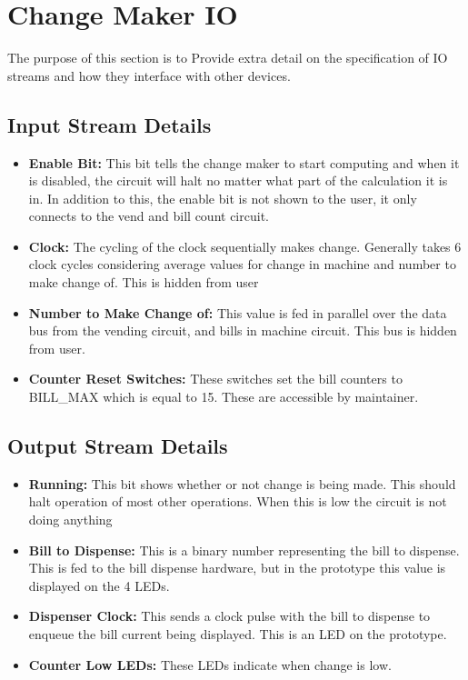 \section{Change Maker IO}
The purpose of this section is to Provide extra detail on
the specification of IO streams and how they interface
with other devices. 

\subsection{Input Stream Details}
\begin{itemize}
\item{\textbf{Enable Bit:} This bit tells the change maker to start computing
and when it is disabled, the circuit will halt no matter what part of
the calculation it is in. In addition to this, the enable bit is not
shown to the user, it only connects to the vend and bill count circuit.}
\item{\textbf{Clock:} The cycling of the clock sequentially makes change. 
Generally takes 6 clock cycles considering average values for change in 
machine and number to make change of. This is hidden from user}
\item{\textbf{Number to Make Change of:} This value is fed in parallel over the
data bus from the vending circuit, and bills in machine circuit. This
bus is hidden from user.}
\item{\textbf{Counter Reset Switches:} These switches set the bill counters to
BILL\_MAX which is equal to 15. These are accessible by maintainer.}
\end{itemize}

\subsection{Output Stream Details}
\begin{itemize}
\item{\textbf{Running:} This bit shows whether or not change is being made.
This should halt operation of most other operations. When this is low the
circuit is not doing anything}
\item{\textbf{Bill to Dispense:} This is a binary number representing the
bill to dispense. This is fed to the bill dispense hardware, but in the
prototype this value is displayed on the 4 LEDs.}
\item{\textbf{Dispenser Clock:} This sends a clock pulse with the bill to
dispense to enqueue the bill current being displayed. This is an LED on
the prototype.}
\item{\textbf{Counter Low LEDs:} These LEDs indicate when change is low.} 
\end{itemize}

